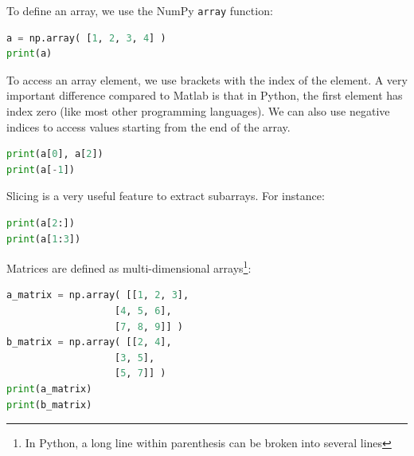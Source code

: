\documentclass[a4paper , 12pt]{book}
\newcommand{\code}[1]{\colorbox{light-gray}{\texttt{#1}}}
\begin{document}
To define an array, we use the NumPy \code{array} function:

\begin{center}
\begin{lstlisting}[language=Python, frame=single]
a = np.array( [1, 2, 3, 4] )
print(a)
\end{lstlisting}
\fbox{
\parbox{\textwidth - 2 \fboxsep}{
\*[1 2 3 4]
}}    
\end{center}

To access an array element, we use brackets with the index of the element. A very important difference compared to Matlab is that in Python, the first element has index zero (like most other programming languages). We can also use negative indices to access values starting from the end of the array.

\begin{center}
\begin{lstlisting}[language=Python, frame=single]
print(a[0], a[2])
print(a[-1])
\end{lstlisting}
\end{center}

Slicing is a very useful feature to extract subarrays. For instance:

\begin{center}
\begin{lstlisting}[language=Python, frame=single]
print(a[2:])
print(a[1:3])
\end{lstlisting}
\fbox{
\parbox{\textwidth - 2 \fboxsep}{
 \*[ 3 4 ] \\
 \*[ 2 3 ]
}}    
\end{center}

Matrices are defined as multi-dimensional arrays\footnote{In Python, a long line within parenthesis can be broken into several lines}:

\begin{center}
\begin{lstlisting}[language=Python, frame=single]
a_matrix = np.array( [[1, 2, 3], 
                   [4, 5, 6], 
                   [7, 8, 9]] )
b_matrix = np.array( [[2, 4],
                   [3, 5],
                   [5, 7]] )
print(a_matrix)
print(b_matrix)
\end{lstlisting}
\fbox{
\parbox{\textwidth - 2 \fboxsep}{
\*[[1 2 3]\\
 \*[4 5 6]\\
 \*[7 8 9]]\\
\*[[2 4]\\
 \*[3 5]\\
 \*[5 7]]
}}   
\end{center}
\end{document}
